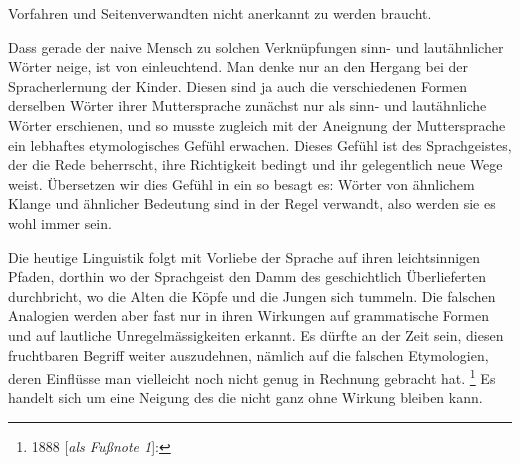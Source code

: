 {Vorfahren und Seitenverwandten nicht anerkannt zu werden braucht.

Dass gerade der naive Mensch zu solchen Verknüpfungen sinn- und lautähnlicher Wörter neige, ist von  einleuchtend. Man denke nur an den Hergang bei der Spracherlernung der Kinder. Diesen sind ja auch die verschiedenen Formen derselben Wörter ihrer Muttersprache zunächst nur als sinn- und lautähnliche Wörter erschienen, und so musste zugleich mit der Aneignung der Muttersprache ein lebhaftes etymologisches Gefühl erwachen. Dieses Gefühl ist  des  Sprachgeistes, der die Rede beherrscht, ihre Richtigkeit bedingt und ihr gelegentlich neue Wege weist. Übersetzen wir dies Gefühl in ein  so besagt es: Wörter von ähnlichem Klange und ähnlicher Bedeutung sind in der Regel verwandt, also werden sie es wohl immer sein.

Die heutige Linguistik folgt mit Vorliebe der Sprache auf ihren leichtsinnigen Pfaden, dorthin wo der Sprachgeist den Damm des geschichtlich Überlieferten durchbricht, wo die Alten die Köpfe  und die Jungen sich tummeln. Die falschen Analogien werden aber fast \label{fp.221} nur in ihren Wirkungen \label{sp.222} auf grammatische Formen und auf lautliche Unregelmässigkeiten erkannt. Es dürfte an der Zeit sein, diesen fruchtbaren Begriff weiter auszudehnen, nämlich auf die falschen Etymologien, deren Einflüsse man vielleicht noch nicht genug in Rechnung gebracht hat. \footnote{1888 [\textit{als Fußnote 1}]: } Es handelt sich um eine Neigung des  die nicht ganz ohne Wirkung bleiben kann.

}
